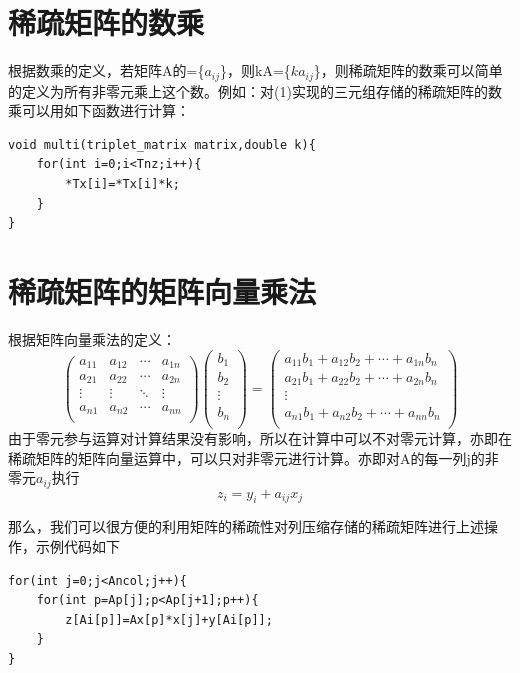 \section{稀疏矩阵的数乘}
根据数乘的定义，若矩阵A的=\{$a_{ij}$\}，则kA=\{$ka_{ij}$\}，则稀疏矩阵的数乘可以简单的定义为所有非零元乘上这个数。例如：对(1)实现的三元组存储的稀疏矩阵的数乘可以用如下函数进行计算：
\begin{lstlisting}
void multi(triplet_matrix matrix,double k){
	for(int i=0;i<Tnz;i++){
		*Tx[i]=*Tx[i]*k;
	}
}
\end{lstlisting}

\section{稀疏矩阵的矩阵向量乘法}
根据矩阵向量乘法的定义：
$$
\left (                 
\begin{array}{cccc}   
    a_{11} & a_{12}& \cdots & a_{1n}\\  
    a_{21} & a_{22}& \cdots & a_{2n}\\  
     \vdots & \vdots& \ddots  & \vdots \\ 
    a_{n1} & a_{n2}& \cdots & a_{nn}\\     
\end{array}
\right)          
\left (                 
\begin{array}{c}   
    b_{1} \\  
    b_{2} \\  
    \vdots \\  
    b_{n} \\  
\end{array}
\right)           
=
\left (                 
\begin{array}{c}   
    a_{11}b_{1}+ a_{12}b_{2}+\cdots+a_{1n}b_{n}\\  
    a_{21}b_{1}+ a_{22}b_{2}+\cdots+a_{2n}b_{n}\\  
    \vdots \\  
     a_{n1}b_{1}+ a_{n2}b_{2}+\cdots+a_{nn}b_{n}\\  
\end{array}
\right)   
$$
由于零元参与运算对计算结果没有影响，所以在计算中可以不对零元计算，亦即在稀疏矩阵的矩阵向量运算中，可以只对非零元进行计算。亦即对A的每一列j的非零元$a_{ij}$执行
$$z_i=y_i+a_{ij}x_j$$

那么，我们可以很方便的利用矩阵的稀疏性对列压缩存储的稀疏矩阵进行上述操作，示例代码如下
\begin{lstlisting}
for(int j=0;j<Ancol;j++){
	for(int p=Ap[j];p<Ap[j+1];p++){
		z[Ai[p]]=Ax[p]*x[j]+y[Ai[p]];
	}
}
\end{lstlisting}



